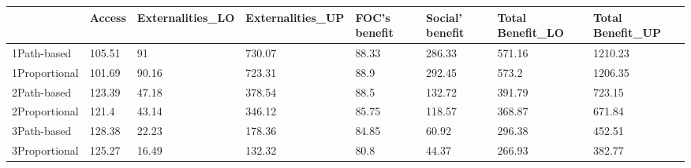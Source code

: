 \begin{tabular}{llllllll}
& Access & Externalities_LO & Externalities_UP & FOC's benefit & Social' benefit & Total Benefit_LO & Total Benefit_UP \\ 
\hline 
1Path-based & 105.51 & 91 & 730.07 & 88.33 & 286.33 & 571.16 & 1210.23 \\ 
1Proportional & 101.69 & 90.16 & 723.31 & 88.9 & 292.45 & 573.2 & 1206.35 \\ 
2Path-based & 123.39 & 47.18 & 378.54 & 88.5 & 132.72 & 391.79 & 723.15 \\ 
2Proportional & 121.4 & 43.14 & 346.12 & 85.75 & 118.57 & 368.87 & 671.84 \\ 
3Path-based & 128.38 & 22.23 & 178.36 & 84.85 & 60.92 & 296.38 & 452.51 \\ 
3Proportional & 125.27 & 16.49 & 132.32 & 80.8 & 44.37 & 266.93 & 382.77 \\ 
\hline 
\end{tabular}